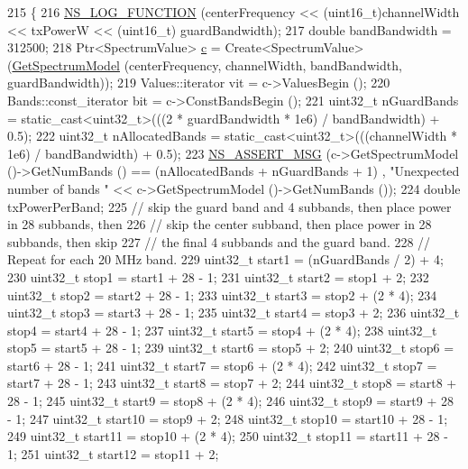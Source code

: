 \begin{DoxyCode}
215 \{
216   \hyperlink{log-macros-disabled_8h_a90b90d5bad1f39cb1b64923ea94c0761}{NS\_LOG\_FUNCTION} (centerFrequency << (uint16\_t)channelWidth << txPowerW << (uint16\_t)
      guardBandwidth);
217   \textcolor{keywordtype}{double} bandBandwidth = 312500;
218   Ptr<SpectrumValue> \hyperlink{lte_2model_2fading-traces_2fading__trace__generator_8m_ae0323a9039add2978bf5b49550572c7c}{c} = Create<SpectrumValue> (\hyperlink{classns3_1_1WifiSpectrumValueHelper_a09b58fb2741ff1a78ae6d952ad08b1bb}{GetSpectrumModel} (centerFrequency, 
      channelWidth, bandBandwidth, guardBandwidth));
219   Values::iterator vit = c->ValuesBegin ();
220   Bands::const\_iterator bit = c->ConstBandsBegin ();
221   uint32\_t nGuardBands = \textcolor{keyword}{static\_cast<}uint32\_t\textcolor{keyword}{>}(((2 * guardBandwidth * 1e6) / bandBandwidth) + 0.5);
222   uint32\_t nAllocatedBands = \textcolor{keyword}{static\_cast<}uint32\_t\textcolor{keyword}{>}(((channelWidth * 1e6) / bandBandwidth) + 0.5);
223   \hyperlink{assert_8h_aff5ece9066c74e681e74999856f08539}{NS\_ASSERT\_MSG} (c->GetSpectrumModel ()->GetNumBands () == (nAllocatedBands + nGuardBands + 1)
      , \textcolor{stringliteral}{"Unexpected number of bands "} << c->GetSpectrumModel ()->GetNumBands ());
224   \textcolor{keywordtype}{double} txPowerPerBand;
225   \textcolor{comment}{// skip the guard band and 4 subbands, then place power in 28 subbands, then}
226   \textcolor{comment}{// skip the center subband, then place power in 28 subbands, then skip}
227   \textcolor{comment}{// the final 4 subbands and the guard band.}
228   \textcolor{comment}{// Repeat for each 20 MHz band.}
229   uint32\_t start1 = (nGuardBands / 2) + 4;
230   uint32\_t stop1 = start1 + 28 - 1;
231   uint32\_t start2 = stop1 + 2;
232   uint32\_t stop2 = start2 + 28 - 1;
233   uint32\_t start3 = stop2 + (2 * 4);
234   uint32\_t stop3 = start3 + 28 - 1;
235   uint32\_t start4 = stop3 + 2;
236   uint32\_t stop4 = start4 + 28 - 1;
237   uint32\_t start5 = stop4 + (2 * 4);
238   uint32\_t stop5 = start5 + 28 - 1;
239   uint32\_t start6 = stop5 + 2;
240   uint32\_t stop6 = start6 + 28 - 1;
241   uint32\_t start7 = stop6 + (2 * 4);
242   uint32\_t stop7 = start7 + 28 - 1;
243   uint32\_t start8 = stop7 + 2;
244   uint32\_t stop8 = start8 + 28 - 1;
245   uint32\_t start9 = stop8 + (2 * 4);
246   uint32\_t stop9 = start9 + 28 - 1;
247   uint32\_t start10 = stop9 + 2;
248   uint32\_t stop10 = start10 + 28 - 1;
249   uint32\_t start11 = stop10 + (2 * 4);
250   uint32\_t stop11 = start11 + 28 - 1;
251   uint32\_t start12 = stop11 + 2;

\end{DoxyCode}
